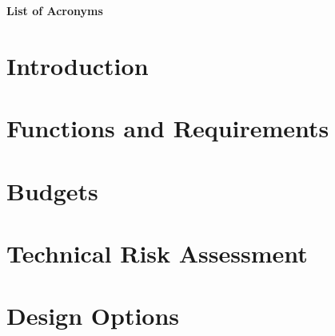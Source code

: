 \documentclass[11pt]{report}
\begin{document}
%
%



%
%



%
%

%

%
%

\tableofcontents

%
%

\newpage
\Large{\textbf{List of Acronyms}}
\small


%
%

\chapter{Introduction}
\label{blIntro}
%

%
%

\chapter{Functions and Requirements}
\label{blFuncChapter}

%
%

\chapter{Budgets}
\label{blBudgets}

%
%

\chapter{Technical Risk Assessment}
\label{blRisk}

%
%

\chapter{Design Options}
\label{blDesignOptions}

%
%
\end{document}
